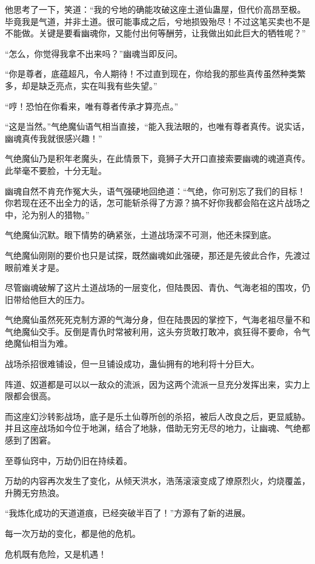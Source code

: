 \begin{this_body}
他思考了一下，笑道：“我的兮地的确能攻破这座土道仙蛊屋，但代价高昂至极。毕竟我是气道，并非土道。很可能事成之后，兮地损毁殆尽！不过这笔买卖也不是不能做。关键是要看幽魂你，又能付出何等酬劳，让我做出如此巨大的牺牲呢？”

“怎么，你觉得我拿不出来吗？”幽魂当即反问。

“你是尊者，底蕴超凡，令人期待！不过直到现在，你给我的那些真传虽然种类繁多，却是缺乏亮点，实在叫我有些失望。”

“哼！恐怕在你看来，唯有尊者传承才算亮点。”

“这是当然。”气绝魔仙语气相当直接，“能入我法眼的，也唯有尊者真传。说实话，幽魂真传我就很感兴趣！”

气绝魔仙乃是积年老魔头，在此情景下，竟狮子大开口直接索要幽魂的魂道真传。此举毫不要脸，十分无耻。

幽魂自然不肯充作冤大头，语气强硬地回绝道：“气绝，你可别忘了我们的目标！你若现在还不出全力的话，怎可能斩杀得了方源？搞不好你我都会陷在这片战场之中，沦为别人的猎物。”

气绝魔仙沉默。眼下情势的确紧张，土道战场深不可测，他还未探到底。

气绝魔仙刚刚的要价也只是试探，既然幽魂如此强硬，那还是先彼此合作，先渡过眼前难关才是。

尽管幽魂破解了这片土道战场的一层变化，但陆畏因、青仇、气海老祖的围攻，仍旧带给他巨大的压力。

气绝魔仙虽然死死克制方源的气海分身，但在陆畏因的掌控下，气海老祖尽量不和气绝魔仙交手。反倒是青仇时常被利用，这头夯货敢打敢冲，疯狂得不要命，令气绝魔仙相当为难。

战场杀招很难铺设，但一旦铺设成功，蛊仙拥有的地利将十分巨大。

阵道、奴道都是可以以一敌众的流派，因为这两个流派一旦充分发挥出来，实力上限都会很高。

而这座幻沙转影战场，底子是乐土仙尊所创的杀招，被后人改良之后，更显威胁。并且这座战场如今位于地渊，结合了地脉，借助无穷无尽的地力，让幽魂、气绝都感到了困窘。

至尊仙窍中，万劫仍旧在持续着。

万劫的内容再次发生了变化，从倾天洪水，浩荡滚滚变成了燎原烈火，灼烧覆盖，升腾无穷热浪。

“我炼化成功的天道道痕，已经突破半百了！”方源有了新的进展。

每一次万劫的变化，都是他的危机。

危机既有危险，又是机遇！

\end{this_body}

